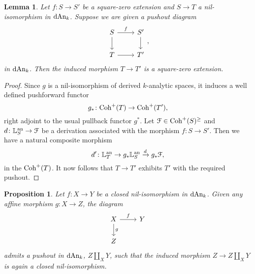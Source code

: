 \documentclass[10pt,a4paper,reqno]{amsart} %
\theoremstyle{plain}
\newtheorem{lem}[thm]{Lemma}
\newtheorem{prop}[thm]{Proposition}
\theoremstyle{definition}
\theoremstyle{remark}
\numberwithin{equation}{section}
\begin{document}
\begin{lem}
    Let $f \colon S \to S'$ be a square-zero extension and $S \to T$ a nil-isomorphism in $\mathrm{dAn}_k$. Suppose we are given a pushout diagram
        \[
        \begin{tikzcd}
            S \ar{r}{f} \ar{d} & S' \ar{d} \\
            T \ar{r} & T'  
        \end{tikzcd},
        \]
    in $\mathrm{dAn}_k$. Then the induced morphism $T \to T'$ is a square-zero extension.
\end{lem}

\begin{proof}
    Since $g$ is a nil-isomorphism of derived $k$-analytic spaces, it induces a well defined pushforward functor
        \[
            g_* \colon \mathrm{Coh}^+(T ) \to \mathrm{Coh}^+(T')  ,
        \]
    right adjoint to the usual pullback functor $g^*$. Let $\mathcal F \in \mathrm{Coh}^+(S)^{\ge }$ and $d \colon \mathbb L^\mathrm{an}_S \to \mathcal F$ be a derivation
    associated with the morphism $f \colon S \to S'$. Then we have a natural composite morphism
        \[
            d ' \colon \mathbb L^\mathrm{an}_T \to g_* \mathbb L^\mathrm{an}_S \xrightarrow{d} g_* \mathcal F,  
        \]
    in the \infcat $\mathrm{Coh}^+(T)$. It now follows that $T \to T'$ exhibits $T'$ with the required pushout.
\end{proof}

\begin{prop} \label{prop:existence_of_pushouts_along_closed_nil-isomorphisms}
    Let $f \colon X \to Y$ be a \emph{closed} nil-isomorphism in $\mathrm{dAn}_k$. Given any \emph{affine} morphism
    $g \colon X \to Z$, the diagram 
        \[
        \begin{tikzcd}
            X \ar{r}{f} \ar{d}{g} & Y \\
            Z
        \end{tikzcd}  
        \]
    admits a pushout in $\mathrm{dAn}_k$, $Z \coprod_X Y$, such that the induced morphism $Z \to Z \coprod_X Y$ is again a closed nil-isomorphism. 
\end{prop}

\end{document}
